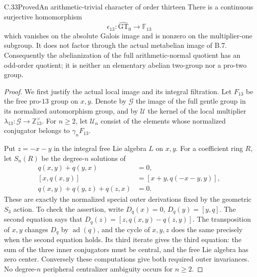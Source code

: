 \begin{statement}{C.33}{Proved}{An arithmetic-trivial character of order thirteen}
There is a continuous surjective homomorphism
\[
 \epsilon_{13}:\widehat{\mathrm{GT}}_0\longrightarrow\mathbb F_{13}
\]
which vanishes on the absolute Galois image and is nonzero on the
multiplier-one subgroup.  It does not factor through the actual
metabelian image of B.7.  Consequently the abelianization of the full
arithmetic-normal quotient has an odd-order quotient; it is neither
an elementary abelian two-group nor a pro-two group.
\end{statement}
\begin{proof}
We first justify the actual local image and its integral filtration.
Let $F_{13}$ be the free pro-$13$ group on $x,y$.  Denote by
$\mathcal G$ the image of the full gentle group in its normalized
automorphism group, and by $\mathcal U$ the kernel of the local
multiplier $\lambda_{13}:\mathcal G\to\mathbb Z_{13}^{\times}$.
For $n\geq2$, let $\mathcal U_n$ consist of the elements whose
normalized conjugator belongs to $\gamma_nF_{13}$.

Put $z=-x-y$ in the integral free Lie algebra $L$ on $x,y$.
For a coefficient ring $R$, let $S_n(R)$ be the degree-$n$ solutions of
\[
\begin{split}
 q(x,y)+q(y,x)&=0,\\
 [x,q(x,y)]&=[x+y,q(-x-y,y)],\\
 q(x,y)+q(y,z)+q(z,x)&=0.
\end{split}                                                    \tag{C33.1}
\]
These are exactly the normalized special outer derivations fixed
by the geometric $S_3$ action.  To check the assertion, write
$D_q(x)=0$, $D_q(y)=[y,q]$.  The second equation says that
$D_q(z)=[z,q(x,y)-q(z,y)]$.  The transposition of $x,y$
changes $D_q$ by $\operatorname{ad}(q)$, and the cycle of $x,y,z$
does the same precisely when the second equation holds.
Its third iterate gives the third equation: the sum of the three
inner conjugators must be central, and the free Lie algebra has
zero center.  Conversely these computations give both required
outer invariances.  No degree-$n$ peripheral centralizer ambiguity
occurs for $n\geq2$.


\end{proof}
